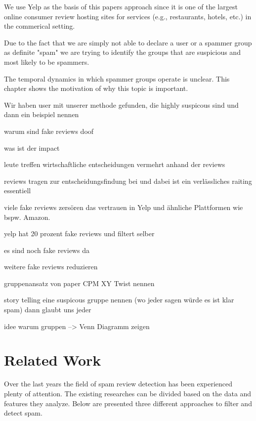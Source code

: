 \documentclass[conference]{IEEEtran}  %
\theoremstyle{plain}
\theoremstyle{definition}
\theoremstyle{remark}
\begin{document}
We use Yelp as the basis of this papers approach since it is one of the largest online consumer review hosting sites for services (e.g., restaurants, hotels, etc.) in the commerical setting. 

Due to the fact that we are simply not able to declare a user or a spammer group as definite "spam" we are trying to identify the groups that are suspicious and most likely to be spammers. 



The temporal dynamics in which spammer groups operate is unclear.%
This chapter shows the motivation of why this topic is important. 

Wir haben user mit unserer methode gefunden, die highly suspicous sind und dann ein beispiel nennen

warum sind fake reviews doof

was ist der impact

leute treffen wirtschaftliche entscheidungen vermehrt anhand der reviews

reviews tragen zur entscheidungsfindung bei und dabei ist ein verlässliches raiting essentiell

viele fake reviews zersören das vertrauen in Yelp und ähnliche Plattformen wie bspw. Amazon.


yelp hat 20 prozent fake reviews
und filtert selber

es sind noch fake reviews da

weitere fake reviews reduzieren

gruppenansatz von paper CPM XY
Twist nennen

story telling eine suspicous gruppe nennen
(wo jeder sagen würde es ist klar spam)
dann glaubt uns jeder

idee warum gruppen --> Venn Diagramm zeigen 

\section{Related Work}
\label{sec:related_work}

Over the last years the field of spam review detection has been experienced plenty of attention. The existing researches can be divided based on the data and features they analyze. Below are presented three different approaches to filter and detect spam. %
\end{document}
